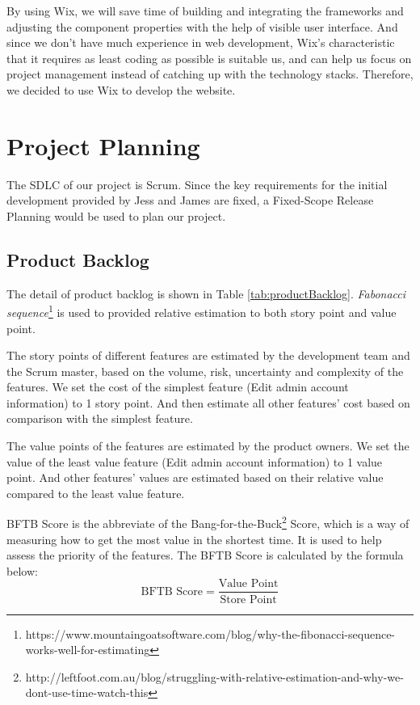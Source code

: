\documentclass{report}
\begin{document}
By using Wix, we will save time of building and integrating the frameworks and adjusting the component properties with the help of visible user interface. And since we don't have much experience in web development, Wix's characteristic that it requires as least coding as possible is suitable us, and can help us focus on project management instead of catching up with the technology stacks. Therefore, we decided to use Wix to develop the website.

\section{Project Planning}
\label{sec:projectPlanning}
The SDLC of our project is Scrum. Since the key requirements for the initial development provided by Jess and James are fixed, a Fixed-Scope Release Planning would be used to plan our project.

\subsection{Product Backlog}
\label{sec:productBacklog}
The detail of product backlog is shown in Table \ref{tab:productBacklog}. \textit{Fabonacci sequence}\footnote{https://www.mountaingoatsoftware.com/blog/why-the-fibonacci-sequence-works-well-for-estimating} is used to provided relative estimation to both story point and value point.

The story points of different features are estimated by the development team and the Scrum master, based on the volume, risk, uncertainty and complexity of the features. We set the cost of the simplest feature (Edit admin account information) to 1 story point. And then estimate all other features' cost based on comparison with the simplest feature. 

The value points of the features are estimated by the product owners. We set the value of the least value feature (Edit admin account information) to 1 value point. And other features' values are estimated based on their relative value compared to the least value feature. 

BFTB Score is the abbreviate of the Bang-for-the-Buck\footnote{http://leftfoot.com.au/blog/struggling-with-relative-estimation-and-why-we-dont-use-time-watch-this} Score, which is a way of measuring how to get the most value in the shortest time. It is used to help assess the priority of the features. The BFTB Score is calculated by the formula below:
$$
  \text{BFTB Score} = \frac{\text{Value Point}}{\text{Store Point}}
$$
\end{document}
